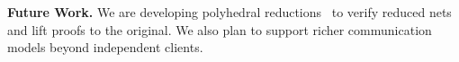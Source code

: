 \smallskip
\noindent
\textbf{Future Work.}
We are developing polyhedral reductions~\cite{AmBeDa21,Be87,BeLeDa20} to verify reduced nets and lift proofs to the original. We also plan to support richer communication models beyond independent clients.
%
%
%
%
%
%
%
%
%



